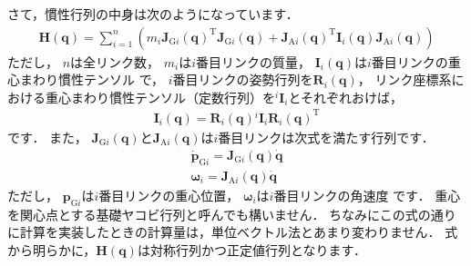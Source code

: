 \documentclass{jsarticle}
\begin{document}
さて，慣性行列の中身は次のようになっています．
\begin{align*}
\bm{H}(\bm{q})=\sum_{i=1}^{n}\left(
m_{i}\bm{J}_{\mathrm{G}i}(\bm{q})^{\mathrm{T}}\bm{J}_{\mathrm{G}i}(\bm{q})
+\bm{J}_{\mathrm{A}i}(\bm{q})^{\mathrm{T}}\bm{I}_{i}(\bm{q})\bm{J}_{\mathrm{A}i}(\bm{q})
\right)
\end{align*}
ただし，
$n$は全リンク数，
$m_{i}$は$i$番目リンクの質量，
$\bm{I}_{i}(\bm{q})$は$i$番目リンクの重心まわり慣性テンソル
で，
$i$番目リンクの姿勢行列を$\bm{R}_{i}(\bm{q})$，
リンク座標系における重心まわり慣性テンソル（定数行列）を${}^{i}\bm{I}_{i}$とそれぞれおけば，
\begin{align*}
\bm{I}_{i}(\bm{q})=\bm{R}_{i}(\bm{q}){}^{i}\bm{I}_{i}\bm{R}_{i}(\bm{q})^{\mathrm{T}}
\end{align*}
です．
また，
$\bm{J}_{\mathrm{G}i}(\bm{q})$と$\bm{J}_{\mathrm{A}i}(\bm{q})$は$i$番目リンクは次式を満たす行列です．
\begin{align*}
\dot{\bm{p}}_{\mathrm{G}i}=\bm{J}_{\mathrm{G}i}(\bm{q})\dot{\bm{q}}
\\
\bm{\omega}_{i}=\bm{J}_{\mathrm{A}i}(\bm{q})\dot{\bm{q}}
\end{align*}
ただし，
$\bm{p}_{\mathrm{G}i}$は$i$番目リンクの重心位置，
$\bm{\omega}_{i}$は$i$番目リンクの角速度
です．
重心を関心点とする基礎ヤコビ行列と呼んでも構いません．
ちなみにこの式の通りに計算を実装したときの計算量は，単位ベクトル法とあまり変わりません．
式から明らかに，$\bm{H}(\bm{q})$は対称行列かつ正定値行列となります．
\end{document}
